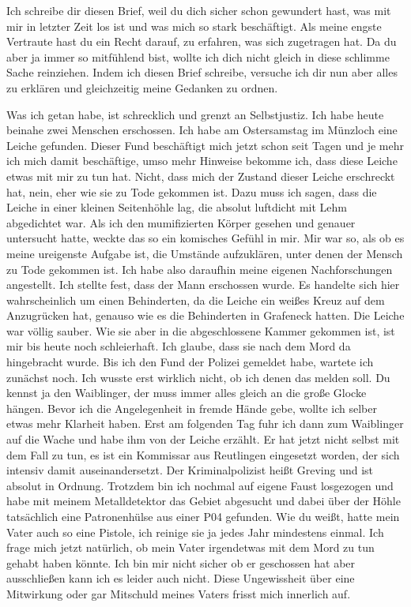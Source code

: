Ich schreibe dir diesen Brief, weil du dich sicher schon gewundert hast, was
mit mir in letzter Zeit los ist und was mich so stark beschäftigt. Als meine
engste Vertraute hast du ein Recht darauf, zu erfahren, was sich zugetragen
hat. Da du aber ja immer so mitfühlend bist, wollte ich dich nicht gleich in
diese schlimme Sache reinziehen. Indem ich diesen Brief schreibe, versuche ich
dir nun aber alles zu erklären und gleichzeitig meine Gedanken zu ordnen.

Was ich getan habe, ist schrecklich und grenzt an Selbstjustiz. Ich habe heute
beinahe zwei Menschen erschossen. Ich habe am Ostersamstag im Münzloch eine
Leiche gefunden. Dieser Fund beschäftigt mich jetzt schon seit Tagen und je
mehr ich mich damit beschäftige, umso mehr Hinweise bekomme ich, dass diese
Leiche etwas mit mir zu tun hat. Nicht, dass mich der Zustand dieser Leiche
erschreckt hat, nein, eher wie sie zu Tode gekommen ist. Dazu muss ich sagen,
dass die Leiche in einer kleinen Seitenhöhle lag, die absolut luftdicht mit
Lehm abgedichtet war. Als ich den mumifizierten Körper gesehen und genauer
untersucht hatte, weckte das so ein komisches Gefühl in mir. Mir war so, als ob
es meine ureigenste Aufgabe ist, die Umstände aufzuklären, unter denen der
Mensch zu Tode gekommen ist. Ich habe also daraufhin meine eigenen
Nachforschungen angestellt. Ich stellte fest, dass der Mann erschossen wurde.
Es handelte sich hier wahrscheinlich um einen Behinderten, da die Leiche ein
weißes Kreuz auf dem Anzugrücken hat, genauso wie es die Behinderten in
Grafeneck hatten. Die Leiche war völlig sauber. Wie sie aber in die
abgeschlossene Kammer gekommen ist, ist mir bis heute noch schleierhaft. Ich
glaube, dass sie nach dem Mord da hingebracht wurde. Bis ich den Fund der
Polizei gemeldet habe, wartete ich zunächst noch. Ich wusste erst wirklich
nicht, ob ich denen das melden soll. Du kennst ja den Waiblinger, der muss
immer alles gleich an die große Glocke hängen. Bevor ich die Angelegenheit in
fremde Hände gebe, wollte ich selber etwas mehr Klarheit haben. Erst am
folgenden Tag fuhr ich dann zum Waiblinger auf die Wache und habe ihm von der
Leiche erzählt. Er hat jetzt nicht selbst mit dem Fall zu tun, es ist ein
Kommissar aus Reutlingen eingesetzt worden, der sich intensiv damit
auseinandersetzt. Der Kriminalpolizist heißt Greving und ist absolut in
Ordnung. Trotzdem bin ich nochmal auf eigene Faust losgezogen und habe mit
meinem Metalldetektor das Gebiet abgesucht und dabei über der Höhle tatsächlich
eine Patronenhülse aus einer P04 gefunden. Wie du weißt, hatte mein Vater auch
so eine Pistole, ich reinige sie ja jedes Jahr mindestens einmal. Ich frage
mich jetzt natürlich, ob mein Vater irgendetwas mit dem Mord zu tun gehabt
haben könnte. Ich bin mir nicht sicher ob er geschossen hat aber ausschließen
kann ich es leider auch nicht. Diese Ungewissheit über eine Mitwirkung oder gar
Mitschuld meines Vaters frisst mich innerlich auf.

